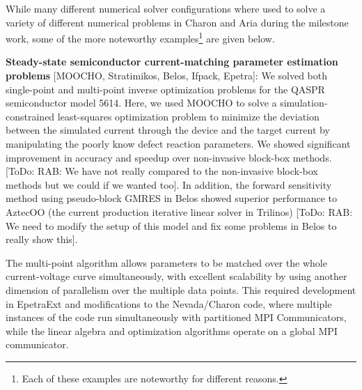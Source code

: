 \documentclass[pdf,ps2pdf,11pt]{SANDreport}
\begin{document}
While many different numerical solver configurations where used to solve a
variety of different numerical problems in Charon and Aria during the
milestone work, some of the more noteworthy examples\footnote{Each of these
examples are noteworthy for different reasons.} are given below.

{}\noindent\textbf{Steady-state semiconductor current-matching parameter
estimation problems} [MOOCHO, Stratimikos, Belos, Ifpack, Epetra]: We solved
both single-point and multi-point inverse optimization problems for the QASPR
semiconductor model 5614.  Here, we used MOOCHO to solve a
simulation-constrained least-squares optimization problem to minimize the
deviation between the simulated current through the device and the target
current by manipulating the poorly know defect reaction parameters.  We showed
significant improvement in accuracy and speedup over non-invasive block-box
methods. [ToDo: RAB: We have not really compared to the non-invasive block-box
methods but we could if we wanted too].  In addition, the forward sensitivity
method using pseudo-block GMRES in Belos showed superior performance to
AztecOO (the current production iterative linear solver in Trilinos) [ToDo:
RAB: We need to modify the setup of this model and fix some problems in Belos
to really show this]. 

The multi-point algorithm allows parameters to be matched
over the whole current-voltage curve simultaneously, with excellent scalability
by using another dimension of parallelism over the multiple data points.
This required development in EpetraExt and modifications to the Nevada/Charon
code, where multiple instances of the code run simultaneously with 
partitioned MPI Communicators, while the linear algebra and optimization
algorithms operate on a global MPI communicator. 
\end{document}
